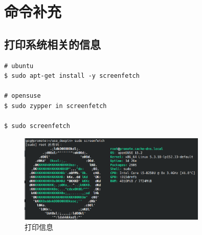 
\chapter{命令补充}
\section{打印系统相关的信息}

\begin{lstlisting}
# ubuntu 
$ sudo apt-get install -y screenfetch 

# opensuse 
$ sudo zypper in screenfetch

$ sudo screenfetch
\end{lstlisting}

\begin{figure}[htp]  
    \centering
    \includegraphics[width=0.8\textwidth]{./img/screenfetch.png} %
    \caption{打印信息} %
    \label{screenfetch} %
\end{figure}
